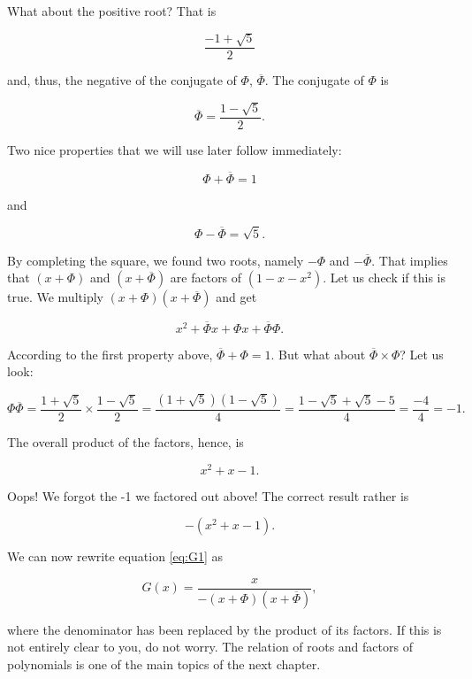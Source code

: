 \documentclass[tikz]{scrreprt}
\begin{document}
What about the positive root? That is

\[
\frac{-1+\sqrt{5}}{2}
\]

and, thus, the negative of the conjugate of $\Phi$,
$\overline{\Phi}$.
The conjugate of $\Phi$ is 

\begin{equation}
\overline{\Phi} = \frac{1 - \sqrt{5}}{2}.
\end{equation}

Two nice properties that we will use later follow immediately:

\begin{equation}
\Phi + \overline{\Phi} = 1
\end{equation}

and

\begin{equation}
\Phi - \overline{\Phi} = \sqrt{5}.
\end{equation}

By completing the square, we found two roots,
namely $-\Phi$ and $-\overline{\Phi}$.
That implies that $(x + \Phi)$ and $(x + \overline{\Phi})$
are factors of $(1 - x - x^2)$.
Let us check if this is true. We multiply
$(x + \Phi)(x + \overline{\Phi})$ and get

\[
x^2 + \overline{\Phi}x + \Phi x + \overline{\Phi}\Phi.
\]

According to the first property above,
$\overline{\Phi} + \Phi = 1$.
But what about $\overline{\Phi}\times \Phi$?
Let us look:

\begin{equation}
\Phi\overline{\Phi} = \frac{1+\sqrt{5}}{2}\times\frac{1-\sqrt{5}}{2} = 
\frac{(1+\sqrt{5})(1-\sqrt{5})}{4} = 
\frac{1-\sqrt{5}+\sqrt{5}-5}{4} =
\frac{-4}{4} = -1.
\end{equation}

The overall product of the factors, hence, is

\[
x^2 + x - 1.
\]

Oops! We forgot the -1 we factored out above!
The correct result rather is

\[
-(x^2 + x - 1).
\]


We can now rewrite equation \ref{eq:G1} as

\begin{equation}\label{eq:G2}
G(x) = \frac{x}{-(x+\Phi)(x+\overline{\Phi})},
\end{equation}

where the denominator has been replaced by 
the product of its factors.
If this is not entirely clear to you,
do not worry. The relation of roots and factors
of polynomials is one of the main topics
of the next chapter.
\end{document}
